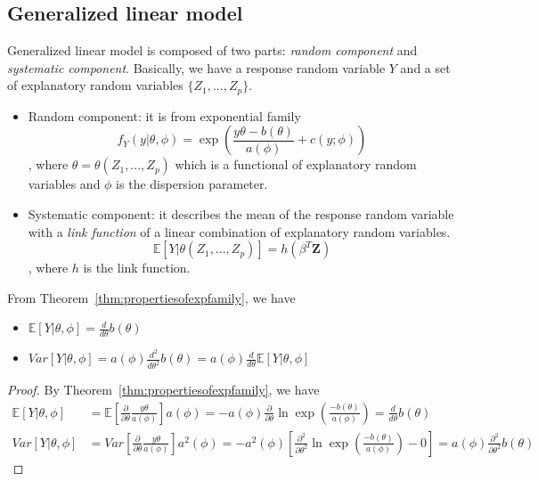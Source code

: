 \documentclass[../Distributions.tex]{subfiles}
\begin{document}
\subsection{Generalized linear model}
Generalized linear model is composed of two parts: {\it random component} and {\it systematic component}. Basically, we have a response random variable $Y$ and a set of explanatory random variables $\{Z_1,...,Z_p\}$.
\begin{itemize}
	\item Random component: it is from exponential family
	$$f_Y(y|\theta,\phi) = \exp(\frac{y\theta - b(\theta)}{a(\phi)}+c(y;\phi))$$
	, where $\theta = \theta(Z_1,...,Z_p)$ which is a functional of explanatory random variables and $\phi$ is the dispersion parameter.
	\item Systematic component: it describes the mean of the response random variable with a {\it link function} of a linear combination of explanatory random variables.
	$$\mathbb{E}[Y|\theta(Z_1,...,Z_p)] = h(\beta^T\mathbf{Z})$$
	, where $h$ is the link function.
\end{itemize}
From Theorem~\ref{thm:propertiesofexpfamily}, we have
\begin{itemize}
	\item $\mathbb{E}[Y|\theta,\phi] = \frac{d}{d\theta}b(\theta)$
	\item $Var[Y|\theta,\phi] = a(\phi)\frac{d^2}{d\theta^2}b(\theta) = a(\phi)\frac{d}{d\theta}\mathbb{E}[Y|\theta,\phi]$
\end{itemize}
\begin{proof}
	By Theorem~\ref{thm:propertiesofexpfamily}, we have
	\begin{align*}
	\mathbb{E}[Y|\theta,\phi] &= \mathbb{E}[\frac{\partial}{\partial\theta}\frac{y\theta}{a(\phi)}]a(\phi) = -a(\phi)\frac{\partial}{\partial\theta}\ln\exp(\frac{-b(\theta)}{a(\phi)}) = \frac{d}{d\theta}b(\theta)\\
	Var[Y|\theta,\phi] &= Var[\frac{\partial}{\partial\theta}\frac{y\theta}{a(\phi)}]a^2(\phi) = -a^2(\phi)[\frac{\partial^2}{\partial\theta^2}\ln\exp(\frac{-b(\theta)}{a(\phi)})-0] = a(\phi)\frac{\partial^2}{\partial\theta^2}b(\theta)
	\end{align*}
\end{proof}
\end{document}
